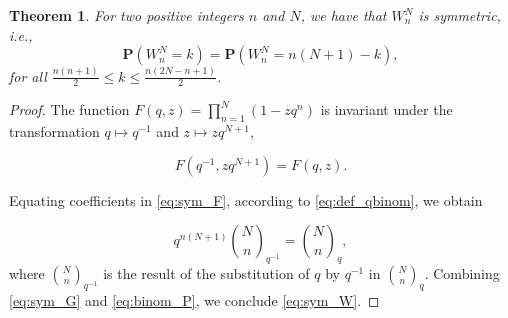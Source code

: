 \documentclass[12pt]{article} %
\newtheorem{theorem}{Theorem}
\theoremstyle{remark}
\begin{document}
\begin{theorem}
For two positive integers $n$ and $N$, we have that $W^N_n$ is symmetric, i.e.,
\begin{equation}
\label{eq:sym_W} \mathbf{P}\left( W^N_n = k \right) = \mathbf{P}\left( W^N_n = n\left(N+1\right) - k \right),
\end{equation}
for all $\frac{n(n+1)}{2} \leq k \leq \frac{n(2N-n+1)}{2}$.
\end{theorem}

\begin{proof}
The function $F(q,z) = \prod_{n=1}^N \left( 1 - z q^n\right)$ is invariant under the transformation $q\mapsto q^{-1}$ and $z\mapsto z q^{N+1}$,

\begin{equation} \label{eq:sym_F}
F\left(q^{-1}, z q^{N+1}\right) = F\left(q, z\right).
\end{equation}

Equating coefficients in \eqref{eq:sym_F}, according to \eqref{eq:def_qbinom}, we obtain

\begin{equation} \label{eq:sym_G}
q^{n(N+1)} \binom{N}{n}_{q^{-1}} = \binom{N}{n}_q,
\end{equation}
where $\binom{N}{n}_{q^{-1}}$ is the result of the substitution of $q$ by $q^{-1}$ in $\binom{N}{n}_q$. Combining \eqref{eq:sym_G} and \eqref{eq:binom_P}, we conclude \eqref{eq:sym_W}.
\end{proof}
\end{document}
